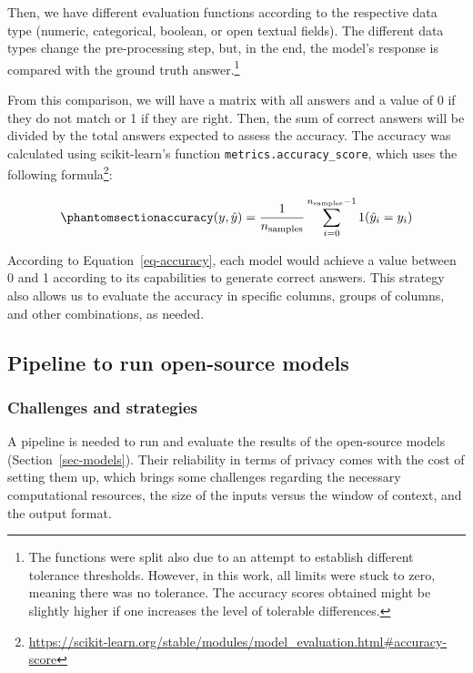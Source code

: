 \documentclass[
  12pt,
]{article}
\begin{document}
Then, we have different evaluation functions according to the respective
data type (numeric, categorical, boolean, or open textual fields). The
different data types change the pre-processing step, but, in the end,
the model's response is compared with the ground truth
answer.\footnote{The functions were split also due to an attempt to
  establish different tolerance thresholds. However, in this work, all
  limits were stuck to zero, meaning there was no tolerance. The
  accuracy scores obtained might be slightly higher if one increases the
  level of tolerable differences.}

From this comparison, we will have a matrix with all answers and a value
of 0 if they do not match or 1 if they are right. Then, the sum of
correct answers will be divided by the total answers expected to assess
the accuracy. The accuracy was calculated using scikit-learn's function
\texttt{metrics.accuracy\_score}, which uses the following
formula\footnote{\url{https://scikit-learn.org/stable/modules/model_evaluation.html\#accuracy-score}}:

\begin{equation}\phantomsection\label{eq-accuracy}{
\texttt{accuracy}(y, \hat{y}) = \frac{1}{n_\text{samples}} \sum_{i=0}^{n_\text{samples}-1} 1(\hat{y}_i = y_i) 
}\end{equation}

According to Equation~\ref{eq-accuracy}, each model would achieve a
value between 0 and 1 according to its capabilities to generate correct
answers. This strategy also allows us to evaluate the accuracy in
specific columns, groups of columns, and other combinations, as needed.

\subsection{Pipeline to run open-source
models}\label{pipeline-to-run-open-source-models}

\subsubsection{Challenges and
strategies}\label{challenges-and-strategies}

A pipeline is needed to run and evaluate the results of the open-source
models (Section~\ref{sec-models}). Their reliability in terms of privacy
comes with the cost of setting them up, which brings some challenges
regarding the necessary computational resources, the size of the inputs
versus the window of context, and the output format.
\end{document}
